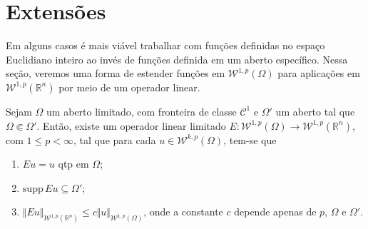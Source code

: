\documentclass[a4paper, 11pt]{book}
\theoremstyle{definition}
\newcommand{\bR}{\mathbb{R}}
\newcommand{\cC}{\mathcal{C}}
\newcommand{\cW}{\mathcal{W}}
\newcommand{\supp}{\mathrm{supp}\,}
\begin{document}
\section{Extensões}

Em alguns casos é mais viável trabalhar com funções definidas no espaço Euclidiano inteiro ao invés de funções definida em um aberto específico.
Nessa seção, veremos uma forma de estender funções em $\cW^{1,p}(\Omega)$ para aplicações em $\cW^{1,p}(\bR^n)$ por meio de um operador linear.

\begin{tbox} \label{thm:extensao}
        Sejam $\Omega$ um aberto limitado, com fronteira de classe $\cC^1$ e $\Omega'$ um aberto tal que $\Omega \Subset \Omega'$. Então, existe um operador linear limitado $E : \cW^{1,p}(\Omega) \to \cW^{1,p}(\bR ^n)$, com $1 \leqslant p < \infty$, tal que para cada $u \in \cW^{k,p}(\Omega)$, tem-se que
    \begin{enumerate}[leftmargin=*, label=\textbf{(\alph*)}]
        \item $Eu = u$ qtp em $\Omega$;
        \item $\supp Eu \subseteq \Omega'$;
        \item $\Vert Eu \Vert_{\cW^{1,p}(\bR^n)} \leqslant c \Vert u \Vert_{\cW^{1,p}(\Omega)}$, onde a constante $c$ depende apenas de $p$, $\Omega$ e $\Omega'$.
    \end{enumerate}
\end{tbox}
\end{document}

